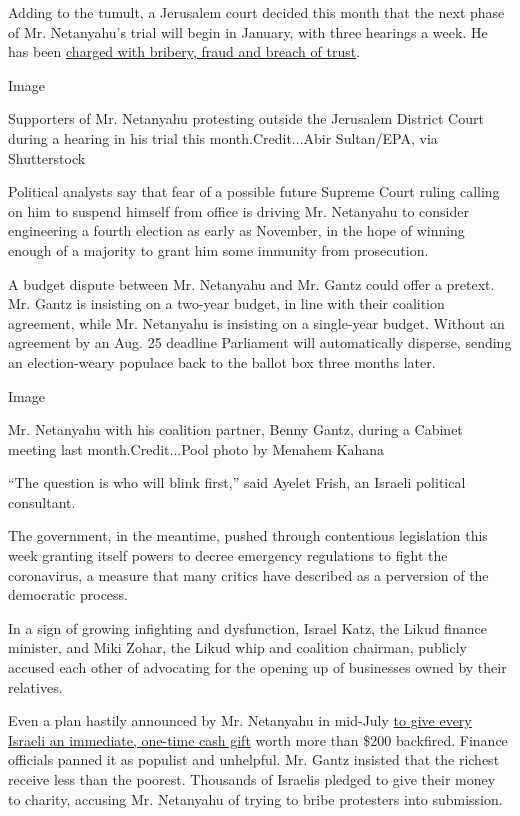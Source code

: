 Adding to the tumult, a Jerusalem court decided this month that the next
phase of Mr. Netanyahu's trial will begin in January, with three
hearings a week. He has been
\href{https://www.nytimes.com/2019/02/28/world/middleeast/benjamin-netanyahu-indictment.html?searchResultPosition=4}{charged
with bribery, fraud and breach of trust}.

Image

Supporters of Mr. Netanyahu protesting outside the Jerusalem District
Court during a hearing in his trial this month.Credit...Abir Sultan/EPA,
via Shutterstock

Political analysts say that fear of a possible future Supreme Court
ruling calling on him to suspend himself from office is driving Mr.
Netanyahu to consider engineering a fourth election as early as
November, in the hope of winning enough of a majority to grant him some
immunity from prosecution.

A budget dispute between Mr. Netanyahu and Mr. Gantz could offer a
pretext. Mr. Gantz is insisting on a two-year budget, in line with their
coalition agreement, while Mr. Netanyahu is insisting on a single-year
budget. Without an agreement by an Aug. 25 deadline Parliament will
automatically disperse, sending an election-weary populace back to the
ballot box three months later.

Image

Mr. Netanyahu with his coalition partner, Benny Gantz, during a Cabinet
meeting last month.Credit...Pool photo by Menahem Kahana

``The question is who will blink first,'' said Ayelet Frish, an Israeli
political consultant.

The government, in the meantime, pushed through contentious legislation
this week granting itself powers to decree emergency regulations to
fight the coronavirus, a measure that many critics have described as a
perversion of the democratic process.

In a sign of growing infighting and dysfunction, Israel Katz, the Likud
finance minister, and Miki Zohar, the Likud whip and coalition chairman,
publicly accused each other of advocating for the opening up of
businesses owned by their relatives.

Even a plan hastily announced by Mr. Netanyahu in mid-July
\href{https://en.globes.co.il/en/article-netanyahu-announces-grants-for-all-israelis-to-stimulate-economy-1001335997}{to
give every Israeli an immediate, one-time cash gift} worth more than
\$200 backfired. Finance officials panned it as populist and unhelpful.
Mr. Gantz insisted that the richest receive less than the poorest.
Thousands of Israelis pledged to give their money to charity, accusing
Mr. Netanyahu of trying to bribe protesters into submission.

